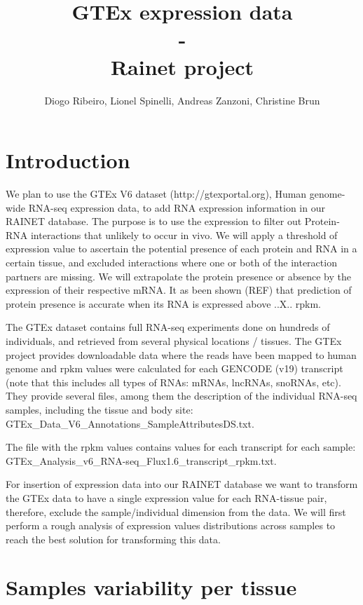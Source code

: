 \documentclass{article}\usepackage[]{graphicx}\usepackage[]{color}
\begin{document}
\title{GTEx expression data\\-\\
        Rainet project}
\author{Diogo Ribeiro, Lionel Spinelli, Andreas Zanzoni, Christine Brun}
\maketitle

\section{Introduction} 

We plan to use the GTEx V6 dataset (http://gtexportal.org), Human genome-wide RNA-seq expression data, to add RNA expression information in our RAINET database. 
The purpose is to use the expression to filter out Protein-RNA interactions that unlikely to occur in vivo. We will apply a threshold of expression value to ascertain the potential presence of each protein and RNA in a certain tissue, and excluded interactions where one or both of the interaction partners are missing. 
We will extrapolate the protein presence or absence by the expression of their respective mRNA. It as been shown (REF) that prediction of protein presence is accurate when its RNA is expressed above ..X.. rpkm. \par
The GTEx dataset contains full RNA-seq experiments done on hundreds of individuals, and retrieved from several physical locations / tissues. 
The GTEx project provides downloadable data where the reads have been mapped to human genome and rpkm values were calculated for each GENCODE (v19) transcript (note that this includes all types of RNAs: mRNAs, lncRNAs, snoRNAs, etc).
They provide several files, among them the description of the individual RNA-seq samples, including the tissue and body site:
GTEx\_Data\_V6\_Annotations\_SampleAttributesDS.txt. \par
The file with the rpkm values contains values for each transcript for each sample:
GTEx\_Analysis\_v6\_RNA-seq\_Flux1.6\_transcript\_rpkm.txt. \par
For insertion of expression data into our RAINET database we want to transform the GTEx data to have a single expression value for each RNA-tissue pair, therefore, exclude the sample/individual dimension from the data. 
We will first perform a rough analysis of expression values distributions across samples to reach the best solution for transforming this data.

\section{Samples variability per tissue}
\end{document}
